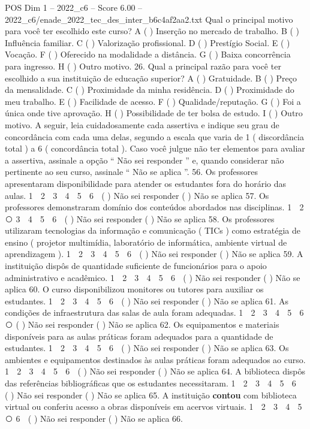 \begin{textsample}{POS Dim 1 – 2022\_c6 – Score 6.00 – 2022\_c6/enade\_2022\_tec\_des\_inter\_b6c4af2aa2.txt}
Qual o principal motivo para você ter escolhido este curso?
A ( ) Inserção no mercado de trabalho.
B ( ) Influência familiar.
C ( ) Valorização profissional.
D ( ) Prestígio Social.
E ( ) Vocação.
F ( ) Oferecido na modalidade a distância.
G ( ) Baixa concorrência para ingresso.
H ( ) Outro motivo. 26.
Qual a principal razão para você ter escolhido a sua instituição de educação superior?
A ( ) Gratuidade.
B ( ) Preço da mensalidade.
C ( ) Proximidade da minha residência.
D ( ) Proximidade do meu trabalho.
E ( ) Facilidade de acesso.
F ( ) Qualidade/reputação.
G ( ) Foi a única onde tive aprovação.
H ( ) Possibilidade de ter bolsa de estudo.
I ( ) Outro motivo.
A seguir, leia cuidadosamente cada assertiva e indique seu grau de concordância com cada uma delas, segundo a escala que varia de 1 ( discordância total ) a 6 ( concordância total ).
Caso você julgue não ter elementos para avaliar a assertiva, assinale a opção “ Não sei responder ” e, quando considerar não pertinente ao seu curso, assinale “ Não se aplica ”. 56.
Os professores apresentaram disponibilidade para atender os estudantes fora do horário das aulas. 1 ⃝ 2 ⃝ 3 ⃝ 4 ⃝ 5 ⃝ 6 ⃝ ( ) Não sei responder ( ) Não se aplica 57.
Os professores demonstraram domínio dos conteúdos abordados nas disciplinas. 1 ⃝ 2 ⃝ 3 ⃝ 4 ⃝ 5 ⃝ 6 ⃝ ( ) Não sei responder ( ) Não se aplica 58.
Os professores utilizaram tecnologias da informação e comunicação ( TICs ) como estratégia de ensino ( projetor multimídia, laboratório de informática, ambiente virtual de aprendizagem ). 1 ⃝ 2 ⃝ 3 ⃝ 4 ⃝ 5 ⃝ 6 ⃝ ( ) Não sei responder ( ) Não se aplica 59.
A instituição dispôs de quantidade suficiente de funcionários para o apoio administrativo e acadêmico. 1 ⃝ 2 ⃝ 3 ⃝ 4 ⃝ 5 ⃝ 6 ⃝ ( ) Não sei responder ( ) Não se aplica 60.
O curso disponibilizou monitores ou tutores para auxiliar os estudantes. 1 ⃝ 2 ⃝ 3 ⃝ 4 ⃝ 5 ⃝ 6 ⃝ ( ) Não sei responder ( ) Não se aplica 61.
As condições de infraestrutura das salas de aula foram adequadas. 1 ⃝ 2 ⃝ 3 ⃝ 4 ⃝ 5 ⃝ 6 ⃝ ( ) Não sei responder ( ) Não se aplica 62.
Os equipamentos e materiais disponíveis para as aulas práticas foram adequados para a quantidade de estudantes. 1 ⃝ 2 ⃝ 3 ⃝ 4 ⃝ 5 ⃝ 6 ⃝ ( ) Não sei responder ( ) Não se aplica 63.
Os ambientes e equipamentos destinados às aulas práticas foram adequados ao curso. 1 ⃝ 2 ⃝ 3 ⃝ 4 ⃝ 5 ⃝ 6 ⃝ ( ) Não sei responder ( ) Não se aplica 64.
A biblioteca dispôs das referências bibliográficas que os estudantes necessitaram. 1 ⃝ 2 ⃝ 3 ⃝ 4 ⃝ 5 ⃝ 6 ⃝ ( ) Não sei responder ( ) Não se aplica 65.
A instituição \textbf{contou} com biblioteca virtual ou conferiu acesso a obras disponíveis em acervos virtuais. 1 ⃝ 2 ⃝ 3 ⃝ 4 ⃝ 5 ⃝ 6 ⃝ ( ) Não sei responder ( ) Não se aplica 66.

\end{textsample}
